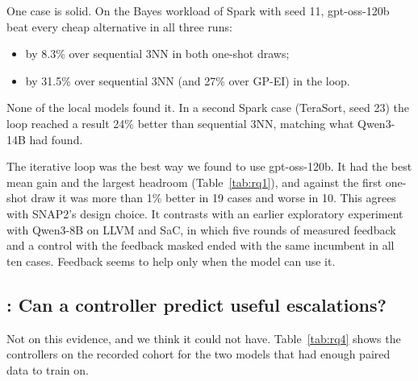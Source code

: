 One case is solid. On the Bayes workload of Spark with seed 11, gpt-oss-120b beat every cheap alternative in all three runs:
\begin{itemize}
  \item by 8.3\% over sequential 3NN in both one-shot draws;
  \item by 31.5\% over sequential 3NN (and 27\% over GP-EI) in the loop.
\end{itemize}
None of the local models found it. In a second Spark case (TeraSort, seed 23) the loop reached a result 24\% better than sequential 3NN, matching what Qwen3-14B had found.

The iterative loop was the best way we found to use gpt-oss-120b. It had the best mean gain and the largest headroom (Table~\ref{tab:rq1}), and against the first one-shot draw it was more than 1\% better in 19 cases and worse in 10. This agrees with SNAP2's design choice. It contrasts with an earlier exploratory experiment with Qwen3-8B on LLVM and SaC, in which five rounds of measured feedback and a control with the feedback masked ended with the same incumbent in all ten cases. Feedback seems to help only when the model can use it.

\subsection{: Can a controller predict useful escalations?}
\label{sec:rq4}

Not on this evidence, and we think it could not have. Table~\ref{tab:rq4} shows the controllers on the recorded cohort for the two models that had enough paired data to train on.

